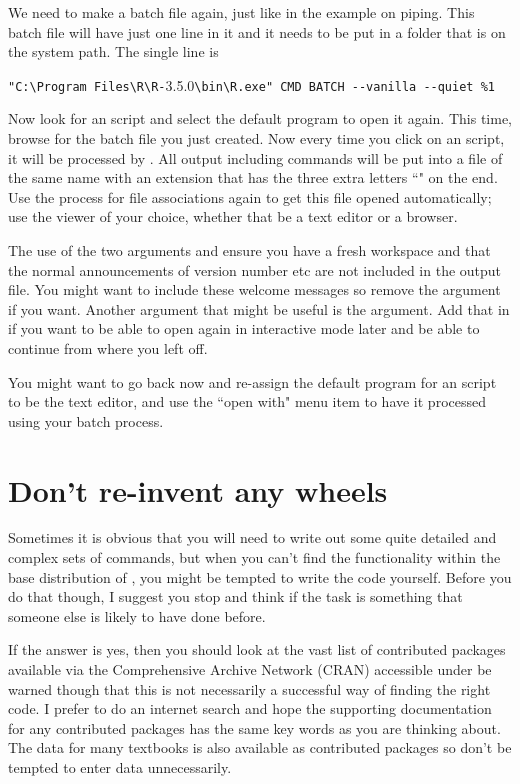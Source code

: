 We need to make a batch file again, just like in the example on piping. This batch file will have just one line in it and it needs to be put in a folder that is on the system path. The single line is 
\begin{center} 
\verb+"C:\Program Files\R\R-+3.5.0\verb+\bin\R.exe" CMD BATCH --vanilla --quiet %1+ 
\end{center} 
 
Now look for an \R{} script and select the default program to open it again. This time, browse for the batch file you just created. Now every time you click on an \R{} script, it will be processed by \R{}. All output including commands will be put into a file of the same name with an extension that has the three extra letters ``" on the end. Use the process for file associations again to get this file opened automatically; use the viewer of your choice, whether  that be a text editor or a browser. 
 
The use of the two arguments  and  ensure you have a fresh workspace and that the normal announcements of version number etc are not included in the output file. You might want to include these welcome messages so remove the  argument if you want. Another argument that might be useful is the  argument. Add that in if you want to be able to open \R{} again in interactive mode later and be able to continue from where you left off. 
 
You might want to go back now and re-assign the default program for an \R{} script to be the text editor, and use the ``open with" menu item to have it processed using your batch process. 
 
 
 
 
 
 
\section{Don't re-invent any wheels} 
 
Sometimes it is obvious that you will need to write out some quite detailed and complex sets of commands, but when you can't find the functionality within the base distribution of \R{}, you might be tempted to write the code yourself. Before you do that though, I suggest you stop and think if the task is something that someone else is likely to have done before. 
 
If the answer is yes, then you should look at the vast list of contributed packages available via the Comprehensive \R{} Archive 
Network (CRAN) accessible under  
be warned though that this is not necessarily a successful way of finding the right code. I prefer to do an internet search and hope the supporting documentation for any contributed packages has the same key words as you are thinking about. The data for many textbooks is also available as contributed packages so don't be tempted to enter data unnecessarily. 
 

